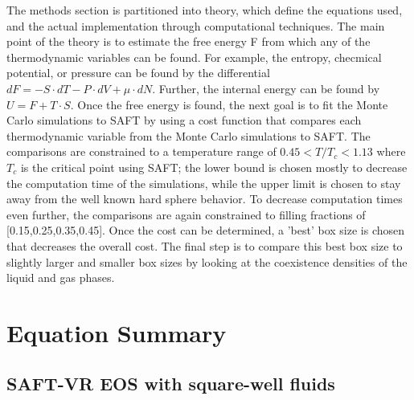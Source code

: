 The methods section is partitioned into theory, which define the equations used, and the actual implementation through computational techniques. The main point of the theory is to estimate the free energy F from which any of the thermodynamic variables can be found. For example, the entropy, checmical potential, or pressure can be found by the differential $dF=-S\cdot dT -P\cdot dV+\mu\cdot dN$. Further, the internal energy can be found by $U=F+T\cdot S$. Once the free energy is found, the next goal is to fit the Monte Carlo simulations to SAFT by using a cost function that compares each thermodynamic variable from the Monte Carlo simulations to SAFT. The comparisons are constrained to a temperature range of $0.45<T/T_c<1.13$ where $T_c$ is the critical point using SAFT; the lower bound is chosen mostly to decrease the computation time of the simulations, while the upper limit is chosen to stay away from the well known hard sphere behavior. To decrease computation times even further, the comparisons are again constrained to filling fractions of [0.15,0.25,0.35,0.45]. Once the cost can be determined, a 'best' box size is chosen that decreases the overall cost. The final step is to compare this best box size to slightly larger and smaller box sizes by looking at the coexistence densities of the liquid and gas phases.

\section{Equation Summary}
\subsection{SAFT-VR EOS with square-well fluids}

